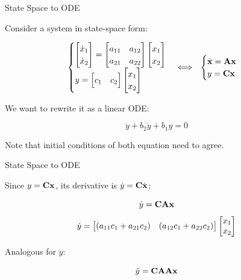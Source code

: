 \documentclass{beamer}
\begin{document}
\begin{frame}{State Space to ODE}
\begin{flushleft}

Consider a system in state-space form:

\begin{equation}
	\label{eq:SS}
	\begin{cases}
		\begin{bmatrix}
			\dot x_1 \\ 
			\dot x_2
		\end{bmatrix} 
		 = 
		\begin{bmatrix}
			a_{11} & a_{12} \\ 
			a_{21} & a_{22}
		\end{bmatrix} 
\begin{bmatrix}
	x_1 \\ 
	x_2
\end{bmatrix} 
		 \\
		y = 
		\begin{bmatrix}
			c_1 & 
			c_2
		\end{bmatrix} 
	\begin{bmatrix}
	x_1 \\ 
	x_2
\end{bmatrix} 
	\end{cases}
\Longleftrightarrow \ \ 
\begin{cases}
\dx{x} = \bo{A} \bo{x} \\
y = \bo{C} \bo{x} 
\end{cases}
\end{equation}

We want to rewrite it as a linear ODE:

\begin{equation}
\label{eq:ODE}
\ddot{y} + b_2 \dot{y} + b_1 y = 0
\end{equation}

Note that initial conditions of both equation need to agree.


\end{flushleft}
\end{frame}



\begin{frame}{State Space to ODE}
\begin{flushleft}

Since $y = \mathbf{C} \mathbf{x}$, its derivative is $\dot y = \mathbf{C} \dot{\mathbf{x}}$:

\begin{equation}
\dot y = \mathbf{C} \mathbf{A} \mathbf{x}
\end{equation}
%
\begin{equation}
\dot y = \begin{bmatrix} (a_{11}c_1 + a_{21}c_2) & (a_{12}c_1 + a_{22}c_2) \end{bmatrix}
\begin{bmatrix} x_1 \\ x_2 \end{bmatrix}    
\end{equation}

Analogous for $\ddot y$:

\begin{equation}
\ddot y = \mathbf{C} \mathbf{A} \mathbf{A} \mathbf{x}
\end{equation}

\end{flushleft}
\end{frame}
\end{document}
